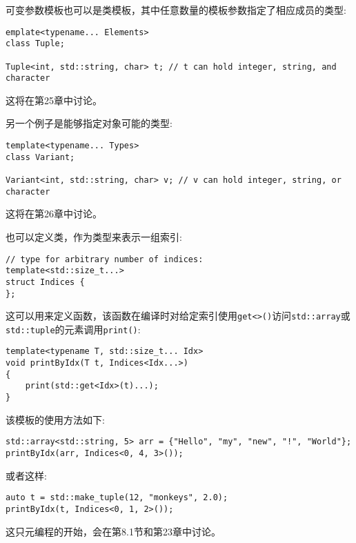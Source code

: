 可变参数模板也可以是类模板，其中任意数量的模板参数指定了相应成员的类型:

\begin{lstlisting}[style=styleCXX]
emplate<typename... Elements>
class Tuple;

Tuple<int, std::string, char> t; // t can hold integer, string, and character
\end{lstlisting}

这将在第25章中讨论。

另一个例子是能够指定对象可能的类型:

\begin{lstlisting}[style=styleCXX]
template<typename... Types>
class Variant;

Variant<int, std::string, char> v; // v can hold integer, string, or character
\end{lstlisting}

这将在第26章中讨论。

也可以定义类，作为类型来表示一组索引:

\begin{lstlisting}[style=styleCXX]
// type for arbitrary number of indices:
template<std::size_t...>
struct Indices {
};
\end{lstlisting}

这可以用来定义函数，该函数在编译时对给定索引使用\texttt{get<>()}访问\texttt{std::array}或\texttt{std::tuple}的元素调用\texttt{print()}:

\begin{lstlisting}[style=styleCXX]
template<typename T, std::size_t... Idx>
void printByIdx(T t, Indices<Idx...>)
{
	print(std::get<Idx>(t)...);
}
\end{lstlisting}

该模板的使用方法如下:

\begin{lstlisting}[style=styleCXX]
std::array<std::string, 5> arr = {"Hello", "my", "new", "!", "World"};
printByIdx(arr, Indices<0, 4, 3>());
\end{lstlisting}

或者这样:

\begin{lstlisting}[style=styleCXX]
auto t = std::make_tuple(12, "monkeys", 2.0);
printByIdx(t, Indices<0, 1, 2>());
\end{lstlisting}

这只元编程的开始，会在第8.1节和第23章中讨论。



